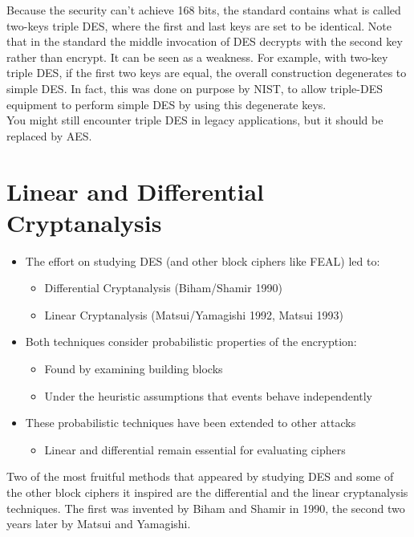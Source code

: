 	Because the security can’t achieve 168 bits, the standard contains what is called two-keys triple DES, where the first and last keys are set to be identical. 
	Note that in the standard the middle invocation of DES decrypts with the second key rather than encrypt.
	It can be seen as a weakness. 
	For example, with two-key triple DES, if the first two keys are equal, the overall construction degenerates to simple DES. 
	In fact, this was done on purpose by NIST, to allow triple-DES equipment to perform simple DES by using this degenerate keys.\\
	You might still encounter triple DES in legacy applications, but it should be replaced by AES.

\section{Linear and Differential Cryptanalysis}
	\begin{itemize}
		\item The effort on studying DES (and other block ciphers like FEAL) led to:
		\begin{itemize}
			\item Differential Cryptanalysis (Biham/Shamir 1990)
			\item Linear Cryptanalysis (Matsui/Yamagishi 1992, Matsui 1993)\\
		\end{itemize}
		\item Both techniques consider probabilistic properties of the encryption:
		\begin{itemize}
			\item Found by examining building blocks
			\item Under the heuristic assumptions that events behave independently\\
		\end{itemize}
		\item These probabilistic techniques have been extended to other attacks
		\begin{itemize}
			\item Linear and differential remain essential for evaluating ciphers
		\end{itemize}
	\end{itemize}
	Two of the most fruitful methods that appeared by studying DES and some of the other block ciphers it inspired are the differential and the linear cryptanalysis techniques. 
	The first was invented by Biham and Shamir in 1990, the second two years later by Matsui and Yamagishi.\\

